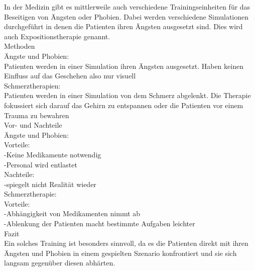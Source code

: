 
In der Medizin gibt es mittlerweile auch verschiedene Trainingseinheiten für das Beseitigen von Ängsten oder Phobien. Dabei werden verschiedene Simulationen durchgeführt in denen die Patienten ihren Ängsten ausgesetzt sind. Dies wird auch Expositionstherapie genannt.\\

Methoden\\
Ängste und Phobien:\\
Patienten werden in einer Simulation ihren Ängsten ausgesetzt. Haben keinen Einfluss auf das Geschehen also nur visuell\\

Schmerztherapien:\\
Patienten werden in einer Simulation von dem Schmerz abgelenkt. Die Therapie fokussiert sich darauf das Gehirn zu entspannen oder die Patienten vor einem Trauma zu bewahren\\

Vor- und Nachteile\\

Ängste und Phobien:\\
Vorteile:\\
-Keine Medikamente notwendig\\
-Personal wird entlastet\\
Nachteile:\\
-spiegelt nicht Realität wieder\\

Schmerztherapie:\\
Vorteile:\\
-Abhängigkeit von Medikamenten nimmt ab\\
-Ablenkung der Patienten macht bestimmte Aufgaben leichter\\

Fazit\\
Ein solches Training ist besonders sinnvoll, da es die Patienten direkt mit ihren Ängsten und Phobien in einem gespielten Szenario konfrontiert und sie sich langsam gegenüber diesen abhärten.





